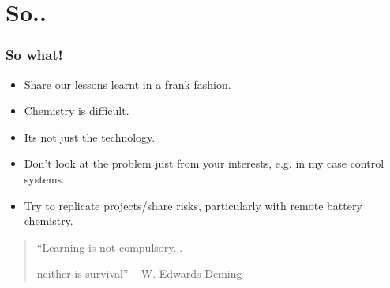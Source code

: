 \documentclass{beamer}
\begin{document}
\section{So..}
\begin{frame}\frametitle{So what!}
  \begin{itemize}
  \item Share our lessons learnt in a frank fashion.\pause
  \item Chemistry is difficult.\pause
  \item Its not just the technology.\pause
  \item Don't look at the problem just from your interests, e.g. in my case
    control systems.\pause
  \item Try to replicate projects/share risks,\pause
    particularly with remote battery chemistry.
  \end{itemize}

\vfill
  \begin{quote}
``Learning is not compulsory... \par\pause
neither is survival'' -- W. Edwards Deming
  \end{quote}
\end{frame}
\end{document}
